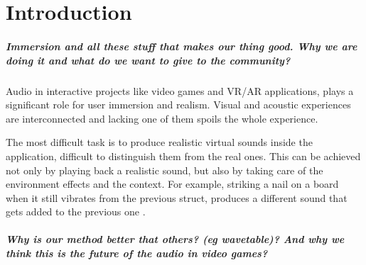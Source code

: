 \chapter{Introduction}
\paragraph{Immersion and all these stuff that makes our thing good. Why we are doing it and what do we want to give to the community?}
\mbox{}\par
Audio in interactive projects like video games and VR/AR applications, plays a significant role for user immersion and realism. Visual and acoustic experiences are interconnected and lacking one of them spoils the whole experience. 
\par
The most difficult task is to produce realistic virtual sounds inside the application, difficult to distinguish them from the real ones. This can be achieved not only by playing back a realistic sound, but also by taking care of the environment effects and the context. For example, striking a nail on a board when it still vibrates from the previous struct, produces a different sound that gets added to the previous one \cite{Cook:2002:RSS:515316}.

\paragraph{Why is our method better that others? (eg wavetable)? And why we think this is the future of the audio in video games?}
  